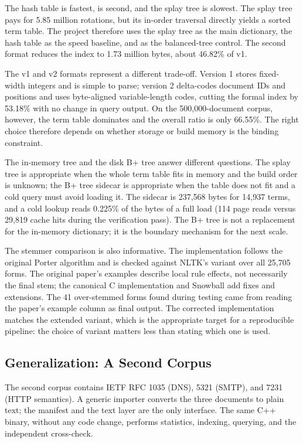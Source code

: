 The hash table is fastest,  is second, and the splay tree is
slowest. The splay tree pays for 5.85 million rotations, but its in-order
traversal directly yields a sorted term table. The project therefore uses the
splay tree as the main dictionary, the hash table as the speed baseline, and
 as the balanced-tree control. The second format reduces the
index to 1.73 million bytes, about 46.82\% of v1.

The v1 and v2 formats represent a different trade-off. Version 1 stores fixed-
width integers and is simple to parse; version 2 delta-codes document IDs and
positions and uses byte-aligned variable-length codes, cutting the formal index
by 53.18\% with no change in query output. On the 500,000-document corpus,
however, the term table dominates and the overall ratio is only 66.55\%. The
right choice therefore depends on whether storage or build memory is the
binding constraint.

The in-memory tree and the disk B+ tree answer different questions. The splay
tree is appropriate when the whole term table fits in memory and the build
order is unknown; the B+ tree sidecar is appropriate when the table does not
fit and a cold query must avoid loading it. The sidecar is 237,568 bytes for
14,937 terms, and a cold lookup reads 0.225\% of the bytes of a full load
(114 page reads versus 29,819 cache hits during the verification pass). The
B+ tree is not a replacement for the in-memory dictionary; it is the boundary
mechanism for the next scale.

The stemmer comparison is also informative. The implementation follows the
original Porter algorithm \cite{porter1980} and is checked against NLTK's
 variant over all 25,705 forms. The original paper's
examples describe local rule effects, not necessarily the final stem; the
canonical C implementation and Snowball add fixes and extensions. The 41
over-stemmed forms found during testing came from reading the paper's example
column as final output. The corrected implementation matches the extended
variant, which is the appropriate target for a reproducible pipeline: the
choice of variant matters less than stating which one is used.

\subsection{Generalization: A Second Corpus}
\label{sec:rfc}
\label{sec:granularity}

The second corpus contains IETF RFC 1035 (DNS), 5321 (SMTP), and 7231 (HTTP
semantics). A generic importer converts the three documents to plain text; the
manifest and the text layer are the only interface. The same C++ binary,
without any code change, performs statistics, indexing, querying, and the
independent cross-check.

